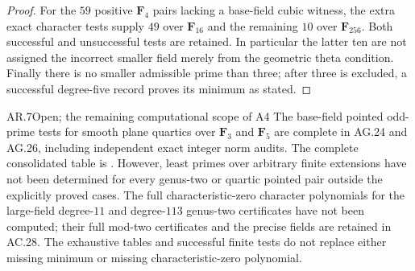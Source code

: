 \begin{proof}
For the $59$ positive $\mathbf F_4$ pairs lacking a base-field
cubic witness, the extra exact character tests supply $49$
over $\mathbf F_{16}$ and the remaining $10$ over
$\mathbf F_{256}$. Both successful and unsuccessful tests are
retained. In particular the latter ten are not assigned the
incorrect smaller field merely from the geometric theta condition.
Finally there is no smaller admissible prime than three; after
three is excluded, a successful degree-five record proves its
minimum as stated.
\end{proof}

\begin{claim}{AR.7}{Open; the remaining computational scope of A4}
The base-field pointed odd-prime tests for smooth plane quartics over
$\mathbf F_3$ and $\mathbf F_5$ are complete in AG.24 and AG.26,
including independent exact integer norm audits. The complete
consolidated table is .
However, least primes over arbitrary finite extensions have not been
determined for every genus-two or quartic pointed pair outside the
explicitly proved cases. The full characteristic-zero character
polynomials for the large-field degree-$11$ and degree-$113$
genus-two certificates have not been computed; their full mod-two
certificates and the precise fields are retained in AC.28.
The exhaustive tables and successful finite tests do not replace
either missing minimum or missing characteristic-zero polynomial.
\end{claim}

